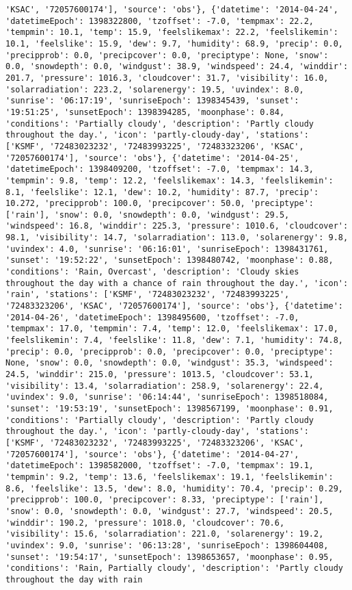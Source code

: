 \documentclass[
  letterpaper,
  DIV=11,
  numbers=noendperiod]{scrartcl}
\begin{document}
\begin{verbatim}
'KSAC', '72057600174'], 'source': 'obs'}, {'datetime': '2014-04-24', 'datetimeEpoch': 1398322800, 'tzoffset': -7.0, 'tempmax': 22.2, 'tempmin': 10.1, 'temp': 15.9, 'feelslikemax': 22.2, 'feelslikemin': 10.1, 'feelslike': 15.9, 'dew': 9.7, 'humidity': 68.9, 'precip': 0.0, 'precipprob': 0.0, 'precipcover': 0.0, 'preciptype': None, 'snow': 0.0, 'snowdepth': 0.0, 'windgust': 38.9, 'windspeed': 24.4, 'winddir': 201.7, 'pressure': 1016.3, 'cloudcover': 31.7, 'visibility': 16.0, 'solarradiation': 223.2, 'solarenergy': 19.5, 'uvindex': 8.0, 'sunrise': '06:17:19', 'sunriseEpoch': 1398345439, 'sunset': '19:51:25', 'sunsetEpoch': 1398394285, 'moonphase': 0.84, 'conditions': 'Partially cloudy', 'description': 'Partly cloudy throughout the day.', 'icon': 'partly-cloudy-day', 'stations': ['KSMF', '72483023232', '72483993225', '72483323206', 'KSAC', '72057600174'], 'source': 'obs'}, {'datetime': '2014-04-25', 'datetimeEpoch': 1398409200, 'tzoffset': -7.0, 'tempmax': 14.3, 'tempmin': 9.8, 'temp': 12.2, 'feelslikemax': 14.3, 'feelslikemin': 8.1, 'feelslike': 12.1, 'dew': 10.2, 'humidity': 87.7, 'precip': 10.272, 'precipprob': 100.0, 'precipcover': 50.0, 'preciptype': ['rain'], 'snow': 0.0, 'snowdepth': 0.0, 'windgust': 29.5, 'windspeed': 16.8, 'winddir': 225.3, 'pressure': 1010.6, 'cloudcover': 98.1, 'visibility': 14.7, 'solarradiation': 113.0, 'solarenergy': 9.8, 'uvindex': 4.0, 'sunrise': '06:16:01', 'sunriseEpoch': 1398431761, 'sunset': '19:52:22', 'sunsetEpoch': 1398480742, 'moonphase': 0.88, 'conditions': 'Rain, Overcast', 'description': 'Cloudy skies throughout the day with a chance of rain throughout the day.', 'icon': 'rain', 'stations': ['KSMF', '72483023232', '72483993225', '72483323206', 'KSAC', '72057600174'], 'source': 'obs'}, {'datetime': '2014-04-26', 'datetimeEpoch': 1398495600, 'tzoffset': -7.0, 'tempmax': 17.0, 'tempmin': 7.4, 'temp': 12.0, 'feelslikemax': 17.0, 'feelslikemin': 7.4, 'feelslike': 11.8, 'dew': 7.1, 'humidity': 74.8, 'precip': 0.0, 'precipprob': 0.0, 'precipcover': 0.0, 'preciptype': None, 'snow': 0.0, 'snowdepth': 0.0, 'windgust': 35.3, 'windspeed': 24.5, 'winddir': 215.0, 'pressure': 1013.5, 'cloudcover': 53.1, 'visibility': 13.4, 'solarradiation': 258.9, 'solarenergy': 22.4, 'uvindex': 9.0, 'sunrise': '06:14:44', 'sunriseEpoch': 1398518084, 'sunset': '19:53:19', 'sunsetEpoch': 1398567199, 'moonphase': 0.91, 'conditions': 'Partially cloudy', 'description': 'Partly cloudy throughout the day.', 'icon': 'partly-cloudy-day', 'stations': ['KSMF', '72483023232', '72483993225', '72483323206', 'KSAC', '72057600174'], 'source': 'obs'}, {'datetime': '2014-04-27', 'datetimeEpoch': 1398582000, 'tzoffset': -7.0, 'tempmax': 19.1, 'tempmin': 9.2, 'temp': 13.6, 'feelslikemax': 19.1, 'feelslikemin': 8.6, 'feelslike': 13.5, 'dew': 8.0, 'humidity': 70.4, 'precip': 0.29, 'precipprob': 100.0, 'precipcover': 8.33, 'preciptype': ['rain'], 'snow': 0.0, 'snowdepth': 0.0, 'windgust': 27.7, 'windspeed': 20.5, 'winddir': 190.2, 'pressure': 1018.0, 'cloudcover': 70.6, 'visibility': 15.6, 'solarradiation': 221.0, 'solarenergy': 19.2, 'uvindex': 9.0, 'sunrise': '06:13:28', 'sunriseEpoch': 1398604408, 'sunset': '19:54:17', 'sunsetEpoch': 1398653657, 'moonphase': 0.95, 'conditions': 'Rain, Partially cloudy', 'description': 'Partly cloudy throughout the day with rain 
\end{verbatim}
\end{document}
